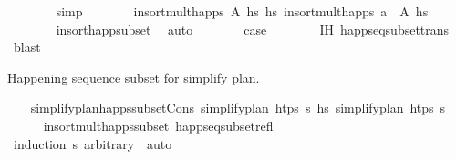 \begin{isabellebody}
\ \ \ \ \ \ \isamarkupfalse%
\ simp\isanewline
\ \ \ \ \isamarkupfalse%
\ \isamarkupfalse%
\ {\isachardoublequoteopen}insort{\isacharunderscore}{\kern0pt}mult{\isacharunderscore}{\kern0pt}happs\ A\ hs\ {\isasymsubseteq}\isactrlsub h\isactrlsub s\ insort{\isacharunderscore}{\kern0pt}mult{\isacharunderscore}{\kern0pt}happs\ {\isacharparenleft}{\kern0pt}a\ {\isacharhash}{\kern0pt}\ A{\isacharparenright}{\kern0pt}\ hs{\isachardoublequoteclose}\isanewline
\ \ \ \ \ \ \isamarkupfalse%
\ insort{\isacharunderscore}{\kern0pt}happ{\isacharunderscore}{\kern0pt}subset\ \isamarkupfalse%
\ auto\isanewline
\ \ \ \ \isamarkupfalse%
\ \isamarkupfalse%
\ {\isacharquery}{\kern0pt}case\isanewline
\ \ \ \ \ \ \isamarkupfalse%
\ {\isachardoublequoteopen}{}{\isachardot}{\kern0pt}IH{\isachardoublequoteclose}\ happ{\isacharunderscore}{\kern0pt}seq{\isacharunderscore}{\kern0pt}subset{\isacharunderscore}{\kern0pt}trans\ \isamarkupfalse%
\ blast\isanewline
\ \ \isamarkupfalse%
%
\endisatagproof
{\isafoldproof}%
%
\isadelimproof
%
\endisadelimproof
%
\begin{isamarkuptext}%
Happening sequence subset for simplify plan.%
\end{isamarkuptext}\isamarkuptrue%
\ \ \isamarkupfalse%
\ simplify{\isacharunderscore}{\kern0pt}plan{\isacharunderscore}{\kern0pt}happs{\isacharunderscore}{\kern0pt}subset{\isacharunderscore}{\kern0pt}Cons{\isacharcolon}{\kern0pt}\ {\isachardoublequoteopen}simplify{\isacharunderscore}{\kern0pt}plan\ htps\ {\isasympi}s\ {\isasymsubseteq}\isactrlsub h\isactrlsub s\ simplify{\isacharunderscore}{\kern0pt}plan\ htps\ {\isacharparenleft}{\kern0pt}{\isasympi}{\isacharhash}{\kern0pt}{\isasympi}s{\isacharparenright}{\kern0pt}{\isachardoublequoteclose}\isanewline
%
\isadelimproof
\ \ \ \ %
\endisadelimproof
%
\isatagproof
{}\isamarkupfalse%
\ insort{\isacharunderscore}{\kern0pt}mult{\isacharunderscore}{\kern0pt}happs{\isacharunderscore}{\kern0pt}subset\ happ{\isacharunderscore}{\kern0pt}seq{\isacharunderscore}{\kern0pt}subset{\isacharunderscore}{\kern0pt}refl\isanewline
\ \ \ \ \isamarkupfalse%
\ {\isacharparenleft}{\kern0pt}induction\ {\isasympi}s\ arbitrary{\isacharcolon}{\kern0pt}\ {\isasympi}{\isacharparenright}{\kern0pt}\ auto%
\endisatagproof
{\isafoldproof}%
%
\isadelimproof
\isanewline
%
\endisadelimproof
\isanewline
\ \ \isamarkupfalse%

\end{isabellebody}
